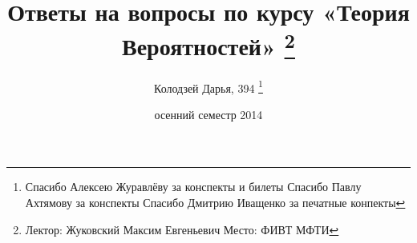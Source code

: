 \documentclass[russian, twoside, 12pt, a5paper]{article}
\theoremstyle{definition}
\begin{document}
\title{Ответы на вопросы по курсу «Теория Вероятностей»
	\thanks{Лектор: Жуковский Максим Евгеньевич\endgraf
	       	Место: ФИВТ МФТИ}
}

\author{Колодзей Дарья, 394
	\thanks{
		Спасибо Алексею Журавлёву за конспекты и билеты\endgraf
		Спасибо Павлу Ахтямову за конспекты\endgraf
		Спасибо Дмитрию Иващенко за печатные конпекты
		}}

\date{осенний семестр 2014}

\maketitle
\tableofcontents



\end{document}
